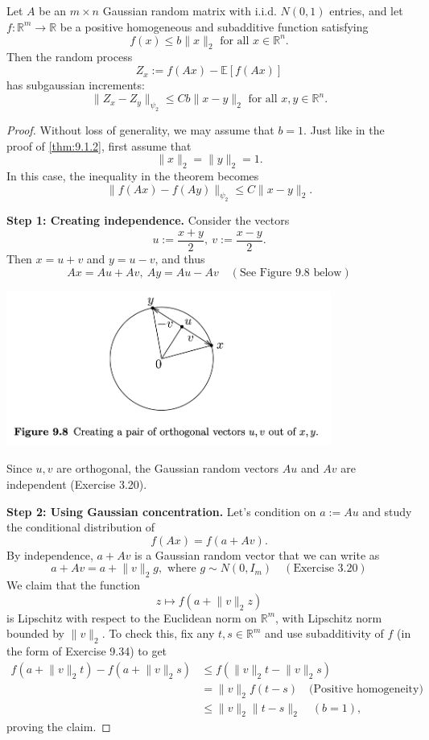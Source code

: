 \begin{theorem}
\label{thm:9.6.4}
Let $A$ be an $m \times n$ Gaussian random matrix with i.i.d. $N(0, 1)$ entries, and let $f: \mathbb{R}^m \to 
\mathbb{R}$ be a positive homogeneous and subadditive function satisfying 
\[ f(x) \leq b \lVert x \rVert_{2} \text{ for all } x \in \mathbb{R}^n. \]
Then the random process 
\[ Z_x := f(Ax) - \mathbb{E}\left[ f(Ax) \right] \]
has subgaussian increments:
\[ \lVert Z_x - Z_y \rVert_{\psi_2} \leq Cb \lVert x - y \rVert_{2} \text{ for all } x, y \in \mathbb{R}^n. \]
\end{theorem}

\begin{proof}
Without loss of generality, we may assume that $b = 1$. Just like in the proof of \cref{thm:9.1.2}, first assume 
that 
\[ \lVert x \rVert_{2} = \lVert y \rVert_{2} = 1. \]
In this case, the inequality in the theorem becomes 
\[ \lVert f(Ax) - f(Ay) \rVert_{\psi_2} \leq C \lVert x - y \rVert_{2}. \]

\textbf{Step 1: Creating independence.} Consider the vectors 
\[ u := \frac{x + y}{2}, \ v := \frac{x - y}{2}. \]
Then $x = u + v$ and $y = u - v$, and thus 
\[ Ax = Au + Av, \ Ay = Au - Av \quad (\text{See Figure 9.8 below}) \]
\begin{center}
	\includegraphics[width=0.8\textwidth]{Chapter 9/fig9-8.png}
\end{center}
Since $u, v$ are orthogonal, the Gaussian random vectors $Au$ and $Av$ are independent (Exercise 3.20).

\textbf{Step 2: Using Gaussian concentration.} Let's condition on $a := Au$ and study the conditional 
distribution of 
\[ f(Ax) = f(a + Av). \]
By independence, $a + Av$ is a Gaussian random vector that we can write as 
\[ a + Av = a + \lVert v \rVert_{2}g, \text{ where } g \sim N(0, I_m) \quad (\text{Exercise 3.20}) \]
We claim that the function 
\[ z \mapsto f(a + \lVert v \rVert_{2}z) \]
is Lipschitz with respect to the Euclidean norm on $\mathbb{R}^m$, with Lipschitz norm bounded by $\lVert v
\rVert_{2}$. To check this, fix any $t, s \in \mathbb{R}^m$ and use subadditivity of $f$ (in the form of 
Exercise 9.34) to get 
\begin{align*}
	f(a + \lVert v \rVert_{2}t) - f(a + \lVert v \rVert_{2}s) 
	&\leq f(\lVert v \rVert_{2}t - \lVert v \rVert_{2}s) \\
	&= \lVert v \rVert_{2} f(t - s) \quad \text{(Positive homogeneity)} \\
	&\leq \lVert v \rVert_{2} \lVert t - s \rVert_{2} \quad (b = 1),
\end{align*}
proving the claim.


\end{proof}
